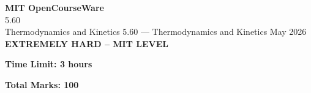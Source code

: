 \documentclass[12pt,a4paper]{exam}
\begin{document}
\begin{center}
{\LARGE \textbf{MIT OpenCourseWare}}\\5.60\\Thermodynamics and Kinetics
\vspace{0.5cm}
{5.60} --- {Thermodynamics and Kinetics}
\vspace{0.3cm}
May 2026
\vspace{0.3cm}
\textbf{EXTREMELY HARD -- MIT LEVEL}
\end{center}

\begin{center}
\textbf{Time Limit: 3 hours}
\end{center}

\begin{center}
\textbf{Total Marks: 100}
\end{center}

\vspace{0.5cm}
\end{document}
